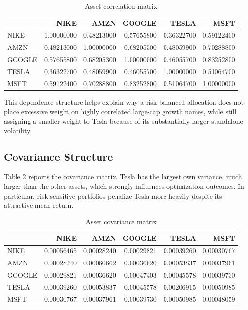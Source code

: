 \documentclass[wcp]{jmlr}
\begin{document}
\begin{table}[H]
\centering
\caption{Asset correlation matrix}
\label{tab:corr_matrix}
\small
\begin{tabular}{lrrrrr}
\toprule
 & NIKE & AMZN & GOOGLE & TESLA & MSFT \\
\midrule
NIKE   & 1.00000000 & 0.48213000 & 0.57655800 & 0.36322700 & 0.59122400 \\
AMZN   & 0.48213000 & 1.00000000 & 0.68205300 & 0.48059900 & 0.70288800 \\
GOOGLE & 0.57655800 & 0.68205300 & 1.00000000 & 0.46055700 & 0.83252800 \\
TESLA  & 0.36322700 & 0.48059900 & 0.46055700 & 1.00000000 & 0.51064700 \\
MSFT   & 0.59122400 & 0.70288800 & 0.83252800 & 0.51064700 & 1.00000000 \\
\bottomrule
\end{tabular}
\end{table}

This dependence structure helps explain why a risk-balanced allocation does not place excessive weight on highly correlated large-cap growth names, while still assigning a smaller weight to Tesla because of its substantially larger standalone volatility.

\subsection{Covariance Structure}

Table \ref{tab:cov_matrix} reports the covariance matrix. Tesla has the largest own variance, much larger than the other assets, which strongly influences optimization outcomes. In particular, risk-sensitive portfolios penalize Tesla more heavily despite its attractive mean return.

\begin{table}[H]
\centering
\caption{Asset covariance matrix}
\label{tab:cov_matrix}
\small
\begin{tabular}{lrrrrr}
\toprule
 & NIKE & AMZN & GOOGLE & TESLA & MSFT \\
\midrule
NIKE   & 0.00056465 & 0.00028240 & 0.00029821 & 0.00039260 & 0.00030767 \\
AMZN   & 0.00028240 & 0.00060662 & 0.00036620 & 0.00053837 & 0.00037961 \\
GOOGLE & 0.00029821 & 0.00036620 & 0.00047403 & 0.00045578 & 0.00039730 \\
TESLA  & 0.00039260 & 0.00053837 & 0.00045578 & 0.00206915 & 0.00050985 \\
MSFT   & 0.00030767 & 0.00037961 & 0.00039730 & 0.00050985 & 0.00048059 \\
\bottomrule
\end{tabular}
\end{table}
\end{document}

